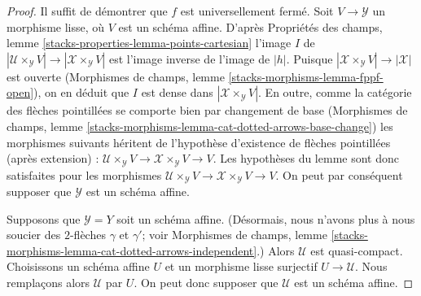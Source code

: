\begin{proof}
Il suffit de démontrer que $f$ est universellement fermé.
Soit $V \to \mathcal{Y}$ un morphisme lisse, où $V$ est un schéma affine.
D'après Propriétés des champs, lemme
\ref{stacks-properties-lemma-points-cartesian}
l'image $I$ de
$|\mathcal{U} \times_\mathcal{Y} V| \to |\mathcal{X} \times_\mathcal{Y} V|$
est l'image inverse de l'image de $|h|$. Puisque
$|\mathcal{X} \times_\mathcal{Y} V| \to |\mathcal{X}|$ est ouverte
(Morphismes de champs, lemme \ref{stacks-morphisms-lemma-fppf-open}),
on en déduit que $I$ est dense dans $|\mathcal{X} \times_\mathcal{Y} V|$.
En outre, comme la catégorie des flèches pointillées se comporte bien par
changement de base (Morphismes de champs, lemme
\ref{stacks-morphisms-lemma-cat-dotted-arrows-base-change})
les morphismes suivants héritent de l'hypothèse d'existence de flèches pointillées
(après extension) :
$\mathcal{U} \times_\mathcal{Y} V \to \mathcal{X} \times_\mathcal{Y} V \to V$.
Les hypothèses du lemme sont donc
satisfaites pour les morphismes
$\mathcal{U} \times_\mathcal{Y} V \to \mathcal{X} \times_\mathcal{Y} V \to V$.
On peut par conséquent supposer que $\mathcal{Y}$ est un schéma affine.

\medskip\noindent
Supposons que $\mathcal{Y} = Y$ soit un schéma affine.
(Désormais, nous n'avons plus à nous soucier des
$2$-flèches $\gamma$ et $\gamma'$; voir Morphismes de champs, lemme
\ref{stacks-morphisms-lemma-cat-dotted-arrows-independent}.)
Alors $\mathcal{U}$ est quasi-compact. Choisissons un schéma affine $U$ et un
morphisme lisse surjectif $U \to \mathcal{U}$.
Nous remplaçons alors $\mathcal{U}$ par $U$.
On peut donc supposer que $\mathcal{U}$ est un schéma affine.


\end{proof}
